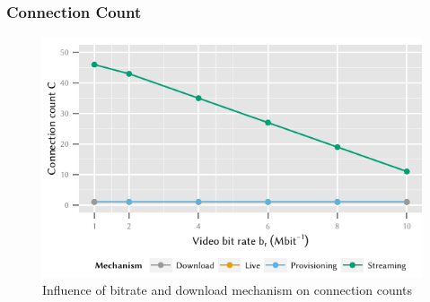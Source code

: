 \subsubsection*{Connection Count}\label{sec:application:lte_video:connection_count}

\begin{figure}
  \centering
  \includegraphics{application/lte_video/numerical_evaluation/figures/bitrate2connections}
  \caption{Influence of bitrate and download mechanism on connection counts}
  \label{fig:application:lte_video:numerical_evaluation:energy_consumption:bitrate2connections}
\end{figure}